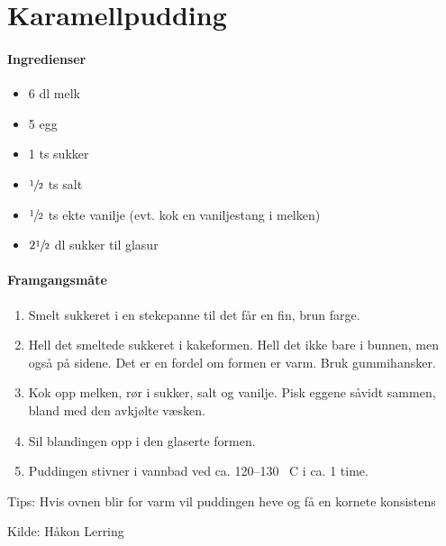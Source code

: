 \section{Karamellpudding}

\paragraph{Ingredienser}
\begin{itemize}[noitemsep]
	\item 6 dl melk
	\item 5 egg
	\item 1 ts sukker
	\item $\sfrac{1}{2}$ ts salt
	\item $\sfrac{1}{2}$ ts ekte vanilje (evt. kok en vaniljestang i melken)
	\item $2 \sfrac{1}{2}$ dl sukker til glasur
\end{itemize}

\paragraph{Framgangsmåte}
\begin{enumerate}
	\item Smelt sukkeret i en stekepanne til det får en fin, brun farge. \item Hell det smeltede sukkeret i kakeformen. Hell det ikke bare i bunnen, men også på sidene. Det er en fordel om formen er varm. Bruk gummihansker.
	\item Kok opp melken, rør i sukker, salt og vanilje. Pisk eggene såvidt sammen, bland med den avkjølte væsken.
	\item Sil blandingen opp i den glaserte formen.
	\item Puddingen stivner i vannbad ved ca. 120--130 \degree~C i ca. 1 time.

\end{enumerate}


Tips: Hvis ovnen blir for varm vil puddingen heve og få en kornete konsistens


Kilde: Håkon Lerring
